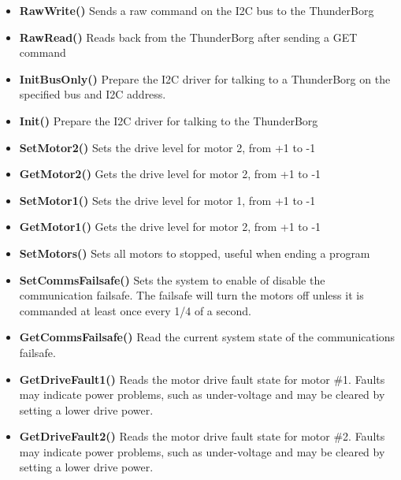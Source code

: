 \begin{itemize}
\item \textbf{RawWrite()} Sends a raw command on the I2C bus to the ThunderBorg 
\item \textbf{RawRead()} Reads back from the ThunderBorg after sending a GET command
\item \textbf{InitBusOnly()} Prepare the I2C driver for talking to a ThunderBorg on the specified bus and I2C address.
\item \textbf{Init()} Prepare the I2C driver for talking to the ThunderBorg
\item \textbf{SetMotor2()} Sets the drive level for motor 2, from +1 to -1
\item \textbf{GetMotor2()} Gets the drive level for motor 2, from +1 to -1
\item \textbf{SetMotor1()} Sets the drive level for motor 1, from +1 to -1
\item \textbf{GetMotor1()} Gets the drive level for motor 2, from +1 to -1
\item \textbf{SetMotors()} Sets all motors to stopped, useful when ending a program
\item \textbf{SetCommsFailsafe()} Sets the system to enable of disable the communication failsafe. The failsafe will turn the motors off unless it is commanded at least once every 1/4 of a second.
\item \textbf{GetCommsFailsafe()} Read the current system state of the communications failsafe. 
\item \textbf{GetDriveFault1()} Reads the motor drive fault state for motor \#1. Faults may indicate power problems, such as under-voltage and may be cleared by setting a lower drive power. 
\item \textbf{GetDriveFault2()} Reads the motor drive fault state for motor \#2. Faults may indicate power problems, such as under-voltage and may be cleared by setting a lower drive power. 

\end{itemize}